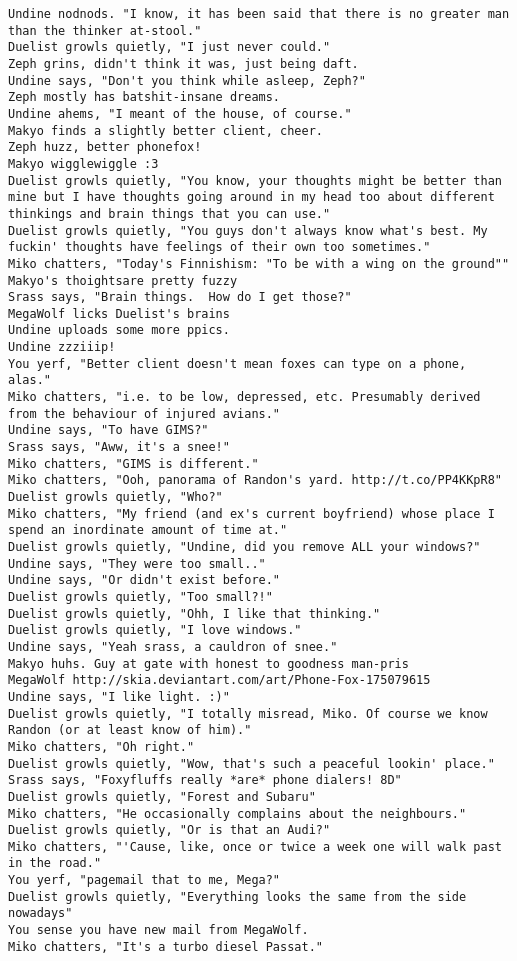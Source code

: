 \begin{verbatim}
Undine nodnods. "I know, it has been said that there is no greater man than the thinker at-stool."
Duelist growls quietly, "I just never could."
Zeph grins, didn't think it was, just being daft.
Undine says, "Don't you think while asleep, Zeph?"
Zeph mostly has batshit-insane dreams.
Undine ahems, "I meant of the house, of course."
Makyo finds a slightly better client, cheer.
Zeph huzz, better phonefox!
Makyo wigglewiggle :3
Duelist growls quietly, "You know, your thoughts might be better than mine but I have thoughts going around in my head too about different thinkings and brain things that you can use."
Duelist growls quietly, "You guys don't always know what's best. My fuckin' thoughts have feelings of their own too sometimes."
Miko chatters, "Today's Finnishism: "To be with a wing on the ground""
Makyo's thoightsare pretty fuzzy
Srass says, "Brain things.  How do I get those?"
MegaWolf licks Duelist's brains
Undine uploads some more ppics.
Undine zzziiip!
You yerf, "Better client doesn't mean foxes can type on a phone, alas."
Miko chatters, "i.e. to be low, depressed, etc. Presumably derived from the behaviour of injured avians."
Undine says, "To have GIMS?"
Srass says, "Aww, it's a snee!"
Miko chatters, "GIMS is different."
Miko chatters, "Ooh, panorama of Randon's yard. http://t.co/PP4KKpR8"
Duelist growls quietly, "Who?"
Miko chatters, "My friend (and ex's current boyfriend) whose place I spend an inordinate amount of time at."
Duelist growls quietly, "Undine, did you remove ALL your windows?"
Undine says, "They were too small.."
Undine says, "Or didn't exist before."
Duelist growls quietly, "Too small?!"
Duelist growls quietly, "Ohh, I like that thinking."
Duelist growls quietly, "I love windows."
Undine says, "Yeah srass, a cauldron of snee."
Makyo huhs. Guy at gate with honest to goodness man-pris
MegaWolf http://skia.deviantart.com/art/Phone-Fox-175079615
Undine says, "I like light. :)"
Duelist growls quietly, "I totally misread, Miko. Of course we know Randon (or at least know of him)."
Miko chatters, "Oh right."
Duelist growls quietly, "Wow, that's such a peaceful lookin' place."
Srass says, "Foxyfluffs really *are* phone dialers! 8D"
Duelist growls quietly, "Forest and Subaru"
Miko chatters, "He occasionally complains about the neighbours."
Duelist growls quietly, "Or is that an Audi?"
Miko chatters, "'Cause, like, once or twice a week one will walk past in the road."
You yerf, "pagemail that to me, Mega?"
Duelist growls quietly, "Everything looks the same from the side nowadays"
You sense you have new mail from MegaWolf.
Miko chatters, "It's a turbo diesel Passat."

\end{verbatim}
